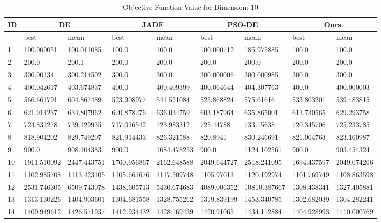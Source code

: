 \begin{table}
\centering
\caption{Objective Function Value for Dimension: 10}
 \begin{tabular}{|p{0.8cm}|p{1.6cm}|p{1.6cm}|p{1.6cm}|p{1.6cm}|p{1.6cm}|p{1.6cm}|p{1.6cm}|p{1.6cm}|} 
 \hline
 ID & \multicolumn{2}{c|}{DE} & \multicolumn{2}{c|}{JADE} & \multicolumn{2}{c|}{PSO-DE} & \multicolumn{2}{c|}{Ours} \\
 \hline
    & best & mean & best & mean & best & mean & best & mean \\ [0.5ex] 
 \hline
1  & 100.000051 & 100.011085 & 100.0 & 100.0 & 100.000712 & 185.975885 & 100.0 & 100.0 \\ 
 \hline
2  & 200.0 & 200.1 & 200.0 & 200.0 & 200.0 & 200.0 & 200.0 & 200.0 \\ 
 \hline
3  & 300.00134 & 300.214502 & 300.0 & 300.0 & 300.000006 & 300.000985 & 300.0 & 300.0 \\ 
 \hline
4  & 400.042617 & 403.674837 & 400.0 & 400.409399 & 400.064644 & 404.307763 & 400.0 & 400.000003 \\ 
 \hline
5  & 566.661791 & 604.867489 & 523.908977 & 541.521084 & 525.868824 & 575.61616 & 533.803201 & 539.483815 \\ 
 \hline
6  & 621.914237 & 634.807962 & 620.878276 & 636.034759 & 603.187964 & 635.865001 & 613.730565 & 629.293758 \\ 
 \hline
7  & 724.831278 & 739.129935 & 717.016542 & 723.983312 & 725.44788 & 733.15638 & 720.345706 & 725.233785 \\ 
 \hline
8  & 818.904202 & 829.749207 & 821.914433 & 826.321588 & 820.8941 & 830.246691 & 821.064763 & 823.160987 \\ 
 \hline
9  & 900.0 & 908.104383 & 900.0 & 1084.478253 & 900.0 & 1124.102561 & 900.0 & 903.454324 \\ 
 \hline
10  & 1911.510092 & 2447.443751 & 1760.956867 & 2162.648588 & 2049.644727 & 2518.241095 & 1694.437597 & 2049.074266 \\ 
 \hline
11  & 1102.985708 & 1113.423105 & 1105.661676 & 1117.509748 & 1105.97013 & 1120.192974 & 1101.769749 & 1108.863598 \\ 
 \hline
12  & 2531.746305 & 6509.743078 & 1438.605713 & 5430.674683 & 4089.006352 & 10810.387667 & 1308.438341 & 1327.405881 \\ 
 \hline
13  & 1313.130226 & 1404.903601 & 1304.681558 & 1328.755262 & 1319.839199 & 1453.340785 & 1302.682039 & 1304.282241 \\ 
 \hline
14  & 1409.949612 & 1426.571937 & 1412.934432 & 1428.169439 & 1420.91065 & 1434.112884 & 1404.928993 & 1410.000769 \\ 

\end{tabular}
\end{table}
